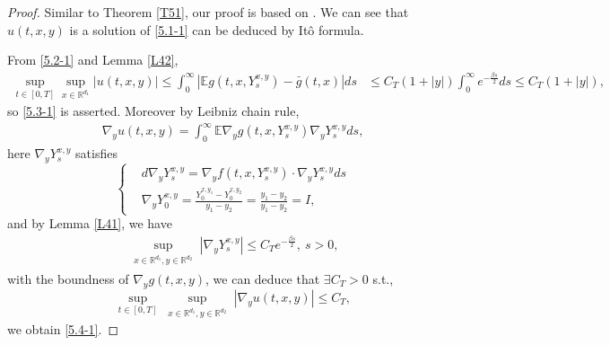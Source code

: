 \documentclass[11pt,reqno]{amsart}
\numberwithin{equation}{section}
\begin{document}
\begin{proof}
Similar to Theorem \ref{T51}, our proof is based on \cite[Proposition 3.3]{SXX}. We can see that $u(t,x,y)$ is a solution of \eqref{5.1-1} can be deduced by It\^{o} formula. %

From \eqref{5.2-1} and Lemma \ref{L42},
\begin{equation}
	\begin{split}
		\sup_{t\in [0,T]}\sup_{x\in \mathbb{R}^{d_{1}}} |u(t,x,y)|\leq \int_{0}^{\infty}|\mathbb{E}g(t,x,Y_{s}^{x,y})-\bar{g}(t,x)|ds
		&\leq  C_{T}(1+|y|)\int_{0}^{\infty}e^{-\frac{\beta s}{2}}ds\leq  C_{T}(1+|y|),
	\end{split}\nonumber
\end{equation}
so \eqref{5.3-1} is asserted.
Moreover by Leibniz chain rule,
\begin{equation}
	\begin{split}
	 \nabla_{y}u(t,x,y)= \int_{0}^{\infty}\mathbb{E}\nabla_{y}g(t,x,Y_{s}^{x,y})\nabla_{y}Y_{s}^{x,y}ds,
	\end{split}\nonumber
\end{equation}
here $ \nabla_{y}Y_{s}^{x,y}$ satisfies
\begin{equation}
	\left\{
	\begin{aligned}
		&d\nabla_{y}Y_{s}^{x,y}= \nabla_{y}f(t,x,Y_{s}^{x,y})\cdot \nabla_{y}Y_{s}^{x,y}ds\\
		&\nabla_{y}Y_{0}^{x,y}=\frac{Y_{0}^{x,y_{1}}-Y_{0}^{x,y_{2}}}{y_{1}-y_{2}}=\frac{y_{1}-y_{2}}{y_{1}-y_{2}}=I,
	\end{aligned}\nonumber
	\right.
\end{equation}
and by Lemma \ref{L41}, we have 
\begin{equation}
	\begin{aligned}
 \sup_{\substack{x\in \mathbb{R}^{d_{1}}, y\in \mathbb{R}^{d_{2}}}}|\nabla_{y}Y_{s}^{x,y}|\leq C_{T}e^{-\frac{\beta s}{2}},\ s>0,
	\end{aligned}\nonumber
\end{equation}
with the boundness of $\nabla_{y}g(t,x,y)$, we can deduce that $\exists C_{T}>0 $ s.t.,
$$	\sup_{t\in [0,T]}  \sup_{\substack{x\in \mathbb{R}^{d_{1}}, y\in \mathbb{R}^{d_{2}}}}|\nabla_{y}u(t,x,y)|\leq C_{T},$$
we obtain \eqref{5.4-1}.
\end{proof}
\end{document}
